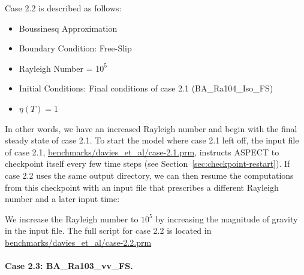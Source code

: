 \documentclass{article}
\newcommand{\aspect}{\textsc{ASPECT}}
\begin{document}
Case 2.2 is described as follows:
\begin{itemize}
\item Boussinesq Approximation
\item Boundary Condition: Free-Slip
\item Rayleigh Number = $10^5$ 
\item Initial Conditions: Final conditions of case 2.1 (BA\_Ra104\_Iso\_FS)
\item $\eta(T) = 1$
\end{itemize}
In other words, we have an increased Rayleigh number and begin with the final
steady state of case 2.1. To start the model where case 2.1 left off, the
input file of case 2.1, \url{benchmarks/davies_et_al/case-2.1.prm}, instructs
\aspect{} to checkpoint itself every few time steps (see
Section~\ref{sec:checkpoint-restart}). If case 2.2 uses the same
output directory, we can then resume the computations from this checkpoint with
an input file that prescribes a different Rayleigh number and a later input time:



We increase the Rayleigh number to $10^5$ by increasing the magnitude of
gravity in the input file.  The full script for case 2.2 is located in
\url{benchmarks/davies_et_al/case-2.2.prm}


\paragraph{Case 2.3: BA\_Ra103\_vv\_FS.}
\label{sec:davies-case23_BA}
\end{document}
